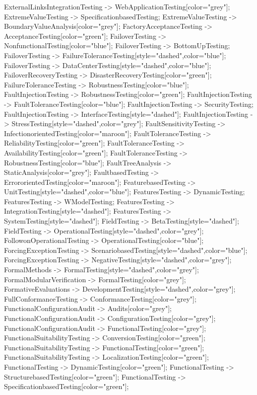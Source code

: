 \documentclass{article}
\begin{document}
{ExternalLinksIntegrationTesting -> WebApplicationTesting[color="grey"];
ExtremeValueTesting -> SpecificationbasedTesting;
ExtremeValueTesting -> BoundaryValueAnalysis[color="grey"];
FactoryAcceptanceTesting -> AcceptanceTesting[color="green"];
FailoverTesting -> NonfunctionalTesting[color="blue"];
FailoverTesting -> BottomUpTesting;
FailoverTesting -> FailureToleranceTesting[style="dashed",color="blue"];
FailoverTesting -> DataCenterTesting[style="dashed",color="blue"];
FailoverRecoveryTesting -> DisasterRecoveryTesting[color="green"];
FailureToleranceTesting -> RobustnessTesting[color="blue"];
FaultInjectionTesting -> RobustnessTesting[color="green"];
FaultInjectionTesting -> FaultToleranceTesting[color="blue"];
FaultInjectionTesting -> SecurityTesting;
FaultInjectionTesting -> InterfaceTesting[style="dashed"];
FaultInjectionTesting -> StressTesting[style="dashed",color="grey"];
FaultSensitivityTesting -> InfectionorientedTesting[color="maroon"];
FaultToleranceTesting -> ReliabilityTesting[color="green"];
FaultToleranceTesting -> AvailabilityTesting[color="green"];
FaultToleranceTesting -> RobustnessTesting[color="blue"];
FaultTreeAnalysis -> StaticAnalysis[color="grey"];
FaultbasedTesting -> ErrororientedTesting[color="maroon"];
FeaturebasedTesting -> UnitTesting[style="dashed",color="blue"];
FeaturesTesting -> DynamicTesting;
FeaturesTesting -> WModelTesting;
FeaturesTesting -> IntegrationTesting[style="dashed"];
FeaturesTesting -> SystemTesting[style="dashed"];
FieldTesting -> BetaTesting[style="dashed"];
FieldTesting -> OperationalTesting[style="dashed",color="grey"];
FollowonOperationalTesting -> OperationalTesting[color="blue"];
ForcingExceptionTesting -> ScenariobasedTesting[style="dashed",color="blue"];
ForcingExceptionTesting -> NegativeTesting[style="dashed",color="grey"];
FormalMethods -> FormalTesting[style="dashed",color="grey"];
FormalModularVerification -> FormalTesting[color="grey"];
FormativeEvaluations -> DevelopmentTesting[style="dashed",color="grey"];
FullConformanceTesting -> ConformanceTesting[color="grey"];
FunctionalConfigurationAudit -> Audits[color="grey"];
FunctionalConfigurationAudit -> ConfigurationTesting[color="grey"];
FunctionalConfigurationAudit -> FunctionalTesting[color="grey"];
FunctionalSuitabilityTesting -> ConversionTesting[color="green"];
FunctionalSuitabilityTesting -> FunctionalTesting[color="green"];
FunctionalSuitabilityTesting -> LocalizationTesting[color="green"];
FunctionalTesting -> DynamicTesting[color="green"];
FunctionalTesting -> StructurebasedTesting[color="green"];
FunctionalTesting -> SpecificationbasedTesting[color="green"];
}
\end{document}
